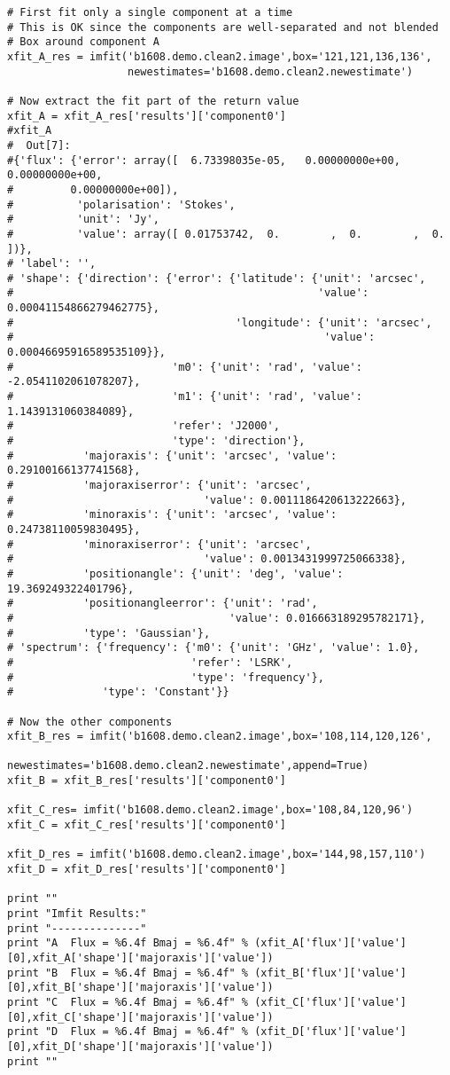 \small
\begin{verbatim}
# First fit only a single component at a time
# This is OK since the components are well-separated and not blended
# Box around component A
xfit_A_res = imfit('b1608.demo.clean2.image',box='121,121,136,136',
                   newestimates='b1608.demo.clean2.newestimate')

# Now extract the fit part of the return value
xfit_A = xfit_A_res['results']['component0']
#xfit_A
#  Out[7]: 
#{'flux': {'error': array([  6.73398035e-05,   0.00000000e+00,   0.00000000e+00,
#         0.00000000e+00]),
#          'polarisation': 'Stokes',
#          'unit': 'Jy',
#          'value': array([ 0.01753742,  0.        ,  0.        ,  0.        ])},
# 'label': '',
# 'shape': {'direction': {'error': {'latitude': {'unit': 'arcsec',
#                                                'value': 0.00041154866279462775},
#                                   'longitude': {'unit': 'arcsec',
#                                                 'value': 0.00046695916589535109}},
#                         'm0': {'unit': 'rad', 'value': -2.0541102061078207},
#                         'm1': {'unit': 'rad', 'value': 1.1439131060384089},
#                         'refer': 'J2000',
#                         'type': 'direction'},
#           'majoraxis': {'unit': 'arcsec', 'value': 0.29100166137741568},
#           'majoraxiserror': {'unit': 'arcsec',
#                              'value': 0.0011186420613222663},
#           'minoraxis': {'unit': 'arcsec', 'value': 0.24738110059830495},
#           'minoraxiserror': {'unit': 'arcsec',
#                              'value': 0.0013431999725066338},
#           'positionangle': {'unit': 'deg', 'value': 19.369249322401796},
#           'positionangleerror': {'unit': 'rad',
#                                  'value': 0.016663189295782171},
#           'type': 'Gaussian'},
# 'spectrum': {'frequency': {'m0': {'unit': 'GHz', 'value': 1.0},
#                            'refer': 'LSRK',
#                            'type': 'frequency'},
#              'type': 'Constant'}}

# Now the other components
xfit_B_res = imfit('b1608.demo.clean2.image',box='108,114,120,126',
                   newestimates='b1608.demo.clean2.newestimate',append=True)
xfit_B = xfit_B_res['results']['component0']

xfit_C_res= imfit('b1608.demo.clean2.image',box='108,84,120,96')
xfit_C = xfit_C_res['results']['component0']

xfit_D_res = imfit('b1608.demo.clean2.image',box='144,98,157,110')
xfit_D = xfit_D_res['results']['component0']

print ""
print "Imfit Results:"
print "--------------"
print "A  Flux = %6.4f Bmaj = %6.4f" % (xfit_A['flux']['value'][0],xfit_A['shape']['majoraxis']['value'])
print "B  Flux = %6.4f Bmaj = %6.4f" % (xfit_B['flux']['value'][0],xfit_B['shape']['majoraxis']['value'])
print "C  Flux = %6.4f Bmaj = %6.4f" % (xfit_C['flux']['value'][0],xfit_C['shape']['majoraxis']['value'])
print "D  Flux = %6.4f Bmaj = %6.4f" % (xfit_D['flux']['value'][0],xfit_D['shape']['majoraxis']['value'])
print ""
\end{verbatim}
\normalsize


